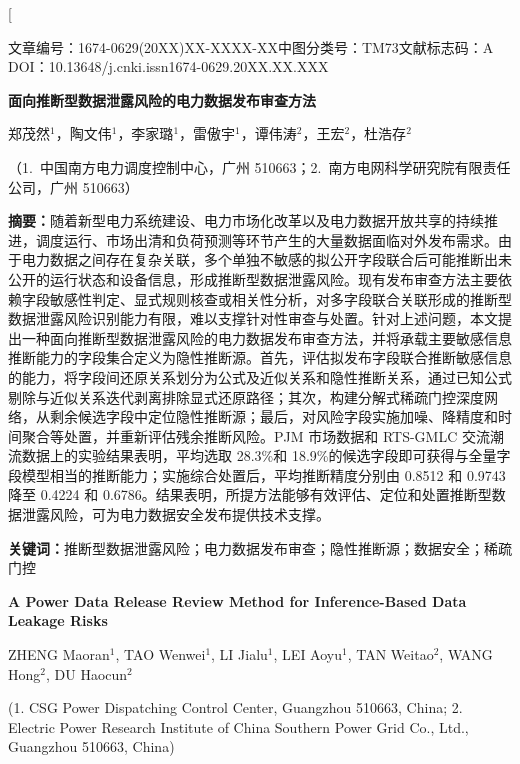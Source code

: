 \documentclass[UTF8,zihao=5,twoside,fontset=none]{ctexart}
\newcommand{\articleinfo}{文章编号：1674-0629(20XX)XX-XXXX-XX\quad 中图分类号：TM73\quad 文献标志码：A\\
DOI：10.13648/j.cnki.issn1674-0629.20XX.XX.XXX}
\begin{document}
\twocolumn[

\begin{center}
{\articleinfo}\par\vspace{1.0em}
{\sffamily{}\bfseries 面向推断型数据泄露风险的电力数据发布审查方法}\par\vspace{0.8em}
{郑茂然$^{1}$，陶文伟$^{1}$，李家璐$^{1}$，雷傲宇$^{1}$，谭伟涛$^{2}$，王宏$^{2}$，杜浩存$^{2}$}\par\vspace{0.4em}
{（1.~中国南方电力调度控制中心，广州 510663；2.~南方电网科学研究院有限责任公司，广州 510663）}\par\vspace{0.8em}
\end{center}

\noindent\textbf{摘要：}随着新型电力系统建设、电力市场化改革以及电力数据开放共享的持续推进，调度运行、市场出清和负荷预测等环节产生的大量数据面临对外发布需求。由于电力数据之间存在复杂关联，多个单独不敏感的拟公开字段联合后可能推断出未公开的运行状态和设备信息，形成推断型数据泄露风险。现有发布审查方法主要依赖字段敏感性判定、显式规则核查或相关性分析，对多字段联合关联形成的推断型数据泄露风险识别能力有限，难以支撑针对性审查与处置。针对上述问题，本文提出一种面向推断型数据泄露风险的电力数据发布审查方法，并将承载主要敏感信息推断能力的字段集合定义为隐性推断源。首先，评估拟发布字段联合推断敏感信息的能力，将字段间还原关系划分为公式及近似关系和隐性推断关系，通过已知公式剔除与近似关系迭代剥离排除显式还原路径；其次，构建分解式稀疏门控深度网络，从剩余候选字段中定位隐性推断源；最后，对风险字段实施加噪、降精度和时间聚合等处置，并重新评估残余推断风险。PJM 市场数据和 RTS-GMLC 交流潮流数据上的实验结果表明，平均选取 28.3\%和 18.9\%的候选字段即可获得与全量字段模型相当的推断能力；实施综合处置后，平均推断精度分别由 0.8512 和 0.9743 降至 0.4224 和 0.6786。结果表明，所提方法能够有效评估、定位和处置推断型数据泄露风险，可为电力数据安全发布提供技术支撑。\par
\noindent\textbf{关键词：}推断型数据泄露风险；电力数据发布审查；隐性推断源；数据安全；稀疏门控\par\vspace{0.8em}

\begin{center}
{\bfseries\large A Power Data Release Review Method for Inference-Based Data Leakage Risks}\par\vspace{0.5em}
{ZHENG Maoran$^{1}$, TAO Wenwei$^{1}$, LI Jialu$^{1}$, LEI Aoyu$^{1}$, TAN Weitao$^{2}$, WANG Hong$^{2}$, DU Haocun$^{2}$}\par\vspace{0.3em}
{\small (1. CSG Power Dispatching Control Center, Guangzhou 510663, China; 2. Electric Power Research Institute of China Southern Power Grid Co., Ltd., Guangzhou 510663, China)}\par\vspace{0.5em}
\end{center}
\end{document}
